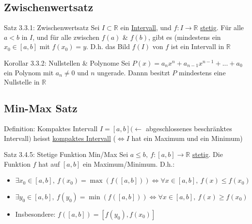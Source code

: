 \documentclass[a4paper,10pt]{article}
\begin{document}
\subsection{Zwischenwertsatz}
\begin{tbox}
    {Satz 3.3.1: Zwischenwertsatz}
    Sei $I\subset \mathbb R$ ein \underline{Intervall}, und $f:I\longrightarrow \mathbb R$ \underline{stetig}. Für alle $a<b$ in $I$, und für alle zwischen $f(a)$ \& $f(b)$, gibt es (mindestens ein $x_0\in [a,b]$ mit $f(x_0)=y$. D.h. das Bild $f(I)$ von $f$ ist ein Intervall in $\mathbb R$
\end{tbox}
\begin{tbox}
    {Korollar 3.3.2: Nullstellen \& Polynome}
    Sei $P(x)=a_nx^n+a_{n-1}x^{n-1}+...+a_0$ ein Polynom mit $a_n\neq 0$ und $n$ ungerade. Dannn besitzt $P$ mindestens eine Nullstelle in $\mathbb{R}$
\end{tbox}
\subsection{Min-Max Satz}
\begin{defbox}
    {Definition: Kompaktes Intervall}
    $I=[a,b] (\leftarrow$ abgeschlossenes beschränktes Intervall$)$ heisst \underline{kompaktes Intervall} ($\iff I$ hat ein Maximum und ein Minimum)
\end{defbox}
\begin{tbox}
    {Satz 3.4.5: Stetige Funktion Min/Max}
    Sei $a\le b,\ f:[a,b]\longrightarrow\mathbb R$ \underline{stetig}. Die Funktion $f$ hat auf $[a,b]$ ein Maximum/Minimum.
    D.h.:
    \begin{itemize}
        \item $\exists x_0\in[a,b],\ f(x_0)=\max{(f([a,b]))} \iff \forall x \in [a,b],\ f(x)\le f(x_0)$
        \item $\exists y_0\in [a,b],\ f(y_0)=\min{(f([a,b]))}\iff \forall x \in [a,b],\ f(x)\ge f(x_0)$
        \item Insbesondere: $f([a,b])=[f(y_0),f(x_0)]$
    \end{itemize}
\end{tbox}
\end{document}
